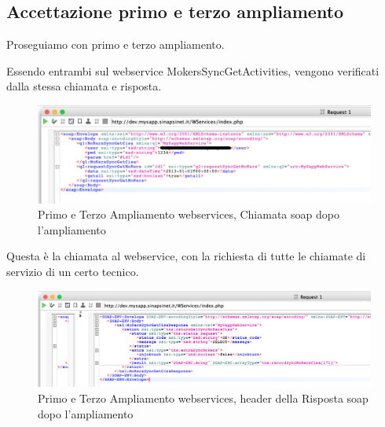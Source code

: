 \subsection{Accettazione primo e terzo ampliamento}
\begin{flushleft}
	Proseguiamo con primo e terzo ampliamento.
	
	Essendo entrambi sul webservice MokersSyncGetActivities, vengono verificati dalla stessa chiamata e risposta.
\end{flushleft}
\begin{figure}[!h] 
	\centering
	\includegraphics[scale = 0.5]{immagini/webservices/ampliamenti/accettazione/3ampl_soap_chiamata.png}
	\caption{Primo e Terzo Ampliamento webservices, Chiamata \gls{soap} dopo l'ampliamento}
\end{figure}

\begin{flushleft}
	Questa è la chiamata al webservice, con la richiesta di tutte le chiamate di servizio di un certo tecnico.
\end{flushleft}

\begin{figure}[!h] 
	\centering
	\includegraphics[scale = 0.5]{immagini/webservices/ampliamenti/accettazione/3ampl__risposta_soap_header.png}
	\caption{Primo e Terzo Ampliamento webservices, header della Risposta \gls{soap} dopo l'ampliamento}
\end{figure}


